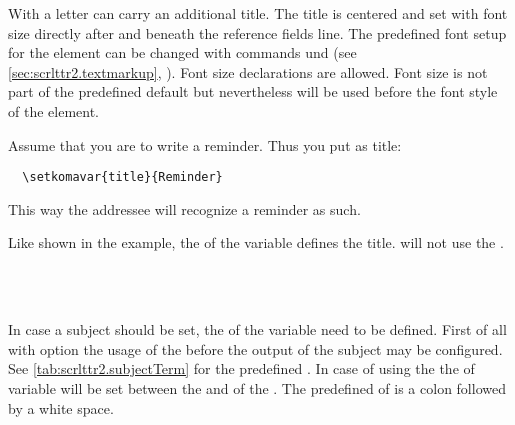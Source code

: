 \begin{Declaration}
\end{Declaration}
%
%
%
With  a letter can carry an additional title. The title is
centered and set with font size  directly after and beneath the
reference fields line.  The predefined font setup for the element
 can be changed with
commands  und  (see
\autoref{sec:scrlttr2.textmarkup},
). Font size declarations are
allowed. Font size  is not part of the predefined default
 but nevertheless will be
used before the font style of the element.
\begin{Example}
  Assume that you are to write a reminder. Thus you put as title:
\begin{lstlisting}
  \setkomavar{title}{Reminder}
\end{lstlisting}
  This way the addressee will recognize a reminder as such.
\end{Example}
Like shown in the example, the  of the variable defines the
title. \KOMAScript{} will not use the .%
%
%
%
%


\begin{Declaration}
  \\
    \\
\end{Declaration}
%
%
%
%
In case a subject should be set, the  of the variable
 need to be defined. First of all with option
 the usage 
of the  before the output of the subject may be
configured. See \autoref{tab:scrlttr2.subjectTerm} for the predefined
. In case of using the  the
 of variable  will
be set between the  and  of the
. The predefined  of 
is a colon followed by a white space.

